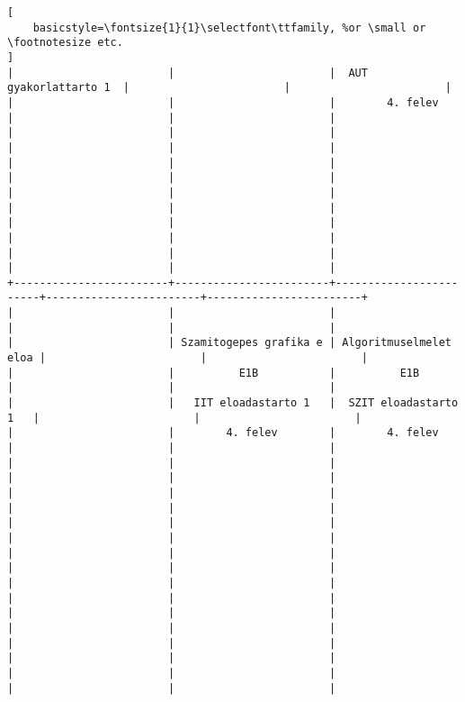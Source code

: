 \begin{lstlisting}[
    basicstyle=\fontsize{1}{1}\selectfont\ttfamily, %or \small or \footnotesize etc.
]
|                        |                        |  AUT gyakorlattarto 1  |                        |                        | 
|                        |                        |        4. felev        |                        |                        | 
|                        |                        |                        |                        |                        | 
|                        |                        |                        |                        |                        | 
|                        |                        |                        |                        |                        | 
|                        |                        |                        |                        |                        | 
|                        |                        |                        |                        |                        | 
+------------------------+------------------------+------------------------+------------------------+------------------------+
|                        |                        |                        |                        |                        | 
|                        | Szamitogepes grafika e | Algoritmuselmelet eloa |                        |                        | 
|                        |          E1B           |          E1B           |                        |                        | 
|                        |   IIT eloadastarto 1   |  SZIT eloadastarto 1   |                        |                        | 
|                        |        4. felev        |        4. felev        |                        |                        | 
|                        |                        |                        |                        |                        | 
|                        |                        |                        |                        |                        | 
|                        |                        |                        |                        |                        | 
|                        |                        |                        |                        |                        | 
|                        |                        |                        |                        |                        | 
|                        |                        |                        |                        |                        | 
|                        |                        |                        |                        |                        | 
|                        |                        |                        |                        |                        | 

\end{lstlisting}

